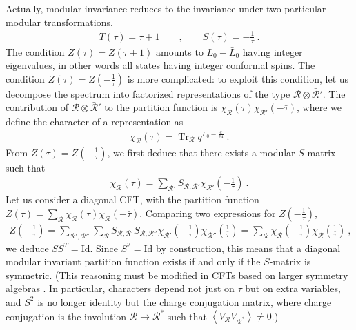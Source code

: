 \documentclass[12pt, a4paper]{article}
\theoremstyle{break}
\begin{document}
Actually, modular invariance reduces to the invariance under two particular modular transformations,
\begin{align}
 T(\tau) = \tau + 1 \qquad , \qquad S(\tau) = -\frac{1}{\tau}\ .
\end{align}
The condition $Z(\tau)=Z(\tau+1)$ amounts to $L_0-\bar{L}_0$ having integer eigenvalues, in other words all states having integer conformal spins.
The condition $Z(\tau)=Z(-\frac{1}{\tau})$ is more complicated: to exploit this condition, let us decompose the spectrum into factorized representations of the type $\mathcal{R}\otimes \bar{\mathcal{R}}'$. 
The contribution of $\mathcal{R}\otimes \bar{\mathcal{R}}'$ to the partition function is $\chi_{\mathcal{R}}(\tau) \chi_{\mathcal{R}'}(-\bar\tau)$, where we define the character of a representation as
\begin{align}
 \chi_\mathcal{R}(\tau) = \operatorname{Tr}_\mathcal{R} q^{L_0-\frac{c}{24}}\ .
\end{align}
From $Z(\tau)=Z(-\frac{1}{\tau})$, we first deduce that there exists a modular $S$-matrix such that 
\begin{align}
 \chi_\mathcal{R}(\tau) = \sum_{\mathcal{R}'} S_{\mathcal{R},\mathcal{R}'} \chi_{\mathcal{R}'}(-\tfrac{1}{\tau})\ .
\end{align}
Let us consider a diagonal CFT, with the partition function $Z(\tau)=\sum_\mathcal{R} \chi_\mathcal{R}(\tau)\chi_{\mathcal{R}}(-\bar{\tau})$.
Comparing two expressions for $Z(-\frac{1}{\tau})$, 
\begin{align}
Z(-\tfrac{1}{\tau}) = \sum_{\mathcal{R}',\mathcal{R}''} \sum_{\mathcal{R}} S_{\mathcal{R},\mathcal{R}'} S_{\mathcal{R},\mathcal{R}''} \chi_{\mathcal{R}'}(-\tfrac{1}{\tau}) \chi_{\mathcal{R}''}(\tfrac{1}{\bar\tau}) = \sum_{\mathcal{R}} \chi_{\mathcal{R}}(-\tfrac{1}{\tau}) \chi_{\mathcal{R}}(\tfrac{1}{\bar\tau})\ ,
\end{align}
we deduce $SS^T=\text{Id}$. Since $S^2=\text{Id}$ by construction, this means that a diagonal modular invariant partition function exists if and only if the $S$-matrix is symmetric. (This reasoning must be modified in CFTs based on larger symmetry algebras \cite{fms97}. In particular, characters depend not just on $\tau$ but on extra variables, and $S^2$ is no longer identity but the charge conjugation matrix, where charge conjugation is the involution $\mathcal{R}\to \mathcal{R}^*$ such that $\left<V_{\mathcal{R}} V_{\mathcal{R}^*}\right>\neq 0$.)
\end{document}
